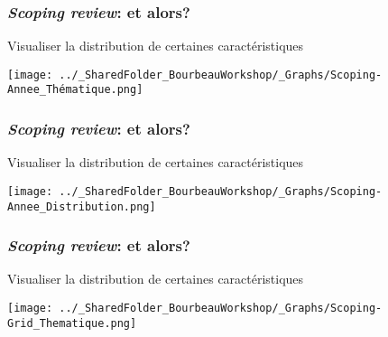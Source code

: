 \documentclass{beamer}
\begin{document}

    \begin{frame}
    
      \frametitle{\emph{Scoping review}: et \R alors?} \vspace{1cm}
      
      Visualiser la distribution de certaines caractéristiques
      
        \begin{center}
         \texttt{[image: ../\_SharedFolder\_BourbeauWorkshop/\_Graphs/Scoping-Annee\_Thématique.png]}
        \end{center} 
      
          
    \end{frame}  
    

    \begin{frame}
    
      \frametitle{\emph{Scoping review}: et \R alors?} \vspace{1cm}
      
      Visualiser la distribution de certaines caractéristiques
      
     \begin{center}
         \texttt{[image: ../\_SharedFolder\_BourbeauWorkshop/\_Graphs/Scoping-Annee\_Distribution.png]}
        \end{center} 
      
          
    \end{frame}  
    
    

    \begin{frame}
    
      \frametitle{\emph{Scoping review}: et \R alors?} \vspace{1cm}
      
      Visualiser la distribution de certaines caractéristiques
      
     \begin{center}
         \texttt{[image: ../\_SharedFolder\_BourbeauWorkshop/\_Graphs/Scoping-Grid\_Thematique.png]}
        \end{center} 
      
          
    \end{frame} 
    
\end{document}
